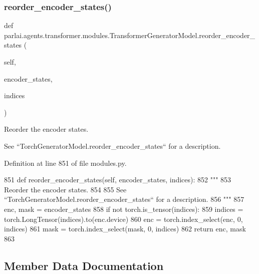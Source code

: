 \subsubsection{\texorpdfstring{reorder\+\_\+encoder\+\_\+states()}{reorder\_encoder\_states()}}
{\footnotesize\ttfamily def parlai.\+agents.\+transformer.\+modules.\+Transformer\+Generator\+Model.\+reorder\+\_\+encoder\+\_\+states (\begin{DoxyParamCaption}\item[{}]{self,  }\item[{}]{encoder\+\_\+states,  }\item[{}]{indices }\end{DoxyParamCaption})}

\begin{DoxyVerb}Reorder the encoder states.

See ``TorchGeneratorModel.reorder_encoder_states`` for a description.
\end{DoxyVerb}
 

Definition at line 851 of file modules.\+py.


\begin{DoxyCode}
851     \textcolor{keyword}{def }reorder\_encoder\_states(self, encoder\_states, indices):
852         \textcolor{stringliteral}{"""}
853 \textcolor{stringliteral}{        Reorder the encoder states.}
854 \textcolor{stringliteral}{}
855 \textcolor{stringliteral}{        See ``TorchGeneratorModel.reorder\_encoder\_states`` for a description.}
856 \textcolor{stringliteral}{        """}
857         enc, mask = encoder\_states
858         \textcolor{keywordflow}{if} \textcolor{keywordflow}{not} torch.is\_tensor(indices):
859             indices = torch.LongTensor(indices).to(enc.device)
860         enc = torch.index\_select(enc, 0, indices)
861         mask = torch.index\_select(mask, 0, indices)
862         \textcolor{keywordflow}{return} enc, mask
863 
\end{DoxyCode}


\subsection{Member Data Documentation}
\mbox{\label{classparlai_1_1agents_1_1transformer_1_1modules_1_1TransformerGeneratorModel_a6467f0fdec226329cb8efe77245996a5}} 
